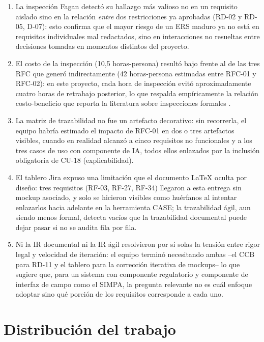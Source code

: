 \documentclass[11pt,a4paper]{article}
\begin{document}
\begin{enumerate}[leftmargin=1.4em]
\item La inspección Fagan detectó su hallazgo más valioso no en un requisito aislado sino en la
relación \emph{entre} dos restricciones ya aprobadas (RD-02 y RD-05, D-07): esto confirma que el
mayor riesgo de un ERS maduro ya no está en requisitos individuales mal redactados, sino en
interacciones no resueltas entre decisiones tomadas en momentos distintos del proyecto.
\item El costo de la inspección (10,5 horas-persona) resultó bajo frente al de las tres RFC que
generó indirectamente (42 horas-persona estimadas entre RFC-01 y RFC-02): en este proyecto, cada
hora de inspección evitó aproximadamente cuatro horas de retrabajo posterior, lo que respalda
empíricamente la relación costo-beneficio que reporta la literatura sobre inspecciones formales
\cite{yousaf2022}.
\item La matriz de trazabilidad no fue un artefacto decorativo: sin recorrerla, el equipo habría
estimado el impacto de RFC-01 en dos o tres artefactos visibles, cuando en realidad alcanzó a
cinco requisitos no funcionales y a los tres casos de uso con componente de IA, todos ellos
enlazados por la inclusión obligatoria de CU-18 (explicabilidad).
\item El tablero Jira expuso una limitación que el documento LaTeX oculta por diseño: tres
requisitos (RF-03, RF-27, RF-34) llegaron a esta entrega sin mockup asociado, y solo se hicieron
visibles como huérfanos al intentar enlazarlos hacia adelante en la herramienta CASE; la
trazabilidad ágil, aun siendo menos formal, detecta vacíos que la trazabilidad documental puede
dejar pasar si no se audita fila por fila.
\item Ni la IR documental ni la IR ágil resolvieron por sí solas la tensión entre rigor legal y
velocidad de iteración: el equipo terminó necesitando ambas --el CCB para RD-11 y el tablero para
la corrección iterativa de mockups-- lo que sugiere que, para un sistema con componente regulatorio
y componente de interfaz de campo como el SIMPA, la pregunta relevante no es cuál enfoque adoptar
sino qué porción de los requisitos corresponde a cada uno.
\end{enumerate}

\section{Distribución del trabajo}
\end{document}
